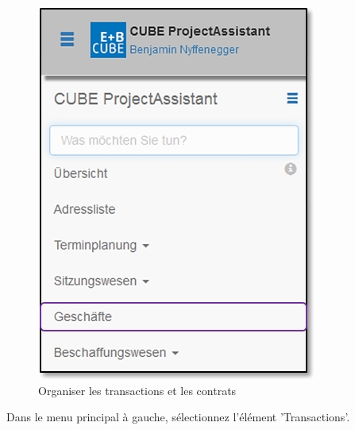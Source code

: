 \begin{figure}   %
  \vspace{-35pt}      %
  \begin{center}
    \includegraphics[width=1\linewidth]{../chapters/06_Geschaefte/pictures/6-1_Menu_Geschaefte.jpg}
  \end{center}
  \vspace{-20pt}
  \caption{Organiser les transactions et les contrats}
  \vspace{-10pt}
\end{figure}

Dans le menu principal à gauche, sélectionnez l'élément 'Transactions'. \\

\vspace{6cm}

\pagebreak

